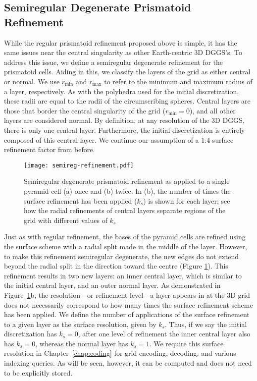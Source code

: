\subsection{Semiregular Degenerate Prismatoid Refinement} \label{chap:5:semireg}
While the regular prismatoid refinement proposed above is simple, it has the same issues near the central singularity as other Earth-centric 3D DGGS's.
To address this issue, we define a semiregular degenerate refinement for the prismatoid cells.
Aiding in this, we classify the layers of the grid as either central or normal.
We use $r_\mathrm{min}$ and $r_\mathrm{max}$ to refer to the minimum and maximum radius of a layer, respectively.
As with the polyhedra used for the initial discretization, these radii are equal to the radii of the circumscribing spheres.
Central layers are those that border the central singularity of the grid ($r_\mathrm{min} = 0$), and all other layers are considered normal.
By definition, at any resolution of the 3D DGGS, there is only one central layer.
Furthermore, the initial discretization is entirely composed of this central layer.
We continue our assumption of a 1:4 surface refinement factor from before.


\begin{figure}[ht!]
	\centering
	\texttt{[image: semireg-refinement.pdf]}
	\caption[Semiregular degenerate prismatoid refinement]{
		Semiregular degenerate prismatoid refinement as applied to a single pyramid cell (a) once and (b) twice.
		In (b), the number of times the surface refinement has been applied ($k_s$) is shown for each layer; see how the radial refinements of central layers separate regions of the grid with different values of $k_s$}
	\label{fig:semiregular}
\end{figure}


Just as with regular refinement, the bases of the pyramid cells are refined using the surface scheme with a radial split made in the middle of the layer.
However, to make this refinement semiregular degenerate, the new edges do not extend beyond the radial split in the direction toward the centre (Figure \ref{fig:semiregular}).
This refinement results in two new layers: an inner central layer, which is similar to the initial central layer, and an outer normal layer.
As demonstrated in Figure~\ref{fig:semiregular}b, the resolution---or refinement level---a layer appears in at the 3D grid does not necessarily correspond to how many times the surface refinement scheme has been applied.
We define the number of applications of the surface refinement to a given layer as the surface resolution, given by $k_s$.
Thus, if we say the initial discretization has $k_s = 0$, after one level of refinement the inner central layer also has $k_s = 0$, whereas the normal layer has $k_s = 1$.
We require this surface resolution in Chapter~\ref{chap:coding} for grid encoding, decoding, and various indexing queries. As will be seen, however, it can be computed and does not need to be explicitly stored.


